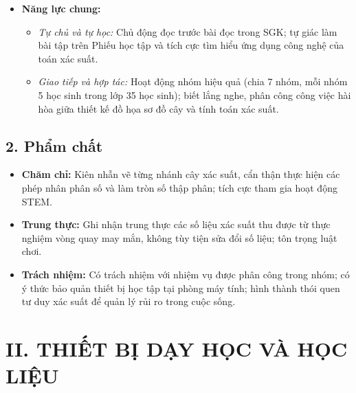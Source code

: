 \documentclass[12pt, a4paper]{article}
\begin{document}
\begin{itemize}[leftmargin=1.2cm]
    \item \textbf{Năng lực chung:}
    \begin{itemize}[leftmargin=0.6cm]
        \item \textit{Tự chủ và tự học:} Chủ động đọc trước bài đọc trong SGK; tự giác làm bài tập trên Phiếu học tập và tích cực tìm hiểu ứng dụng công nghệ của toán xác suất.
        \item \textit{Giao tiếp và hợp tác:} Hoạt động nhóm hiệu quả (chia 7 nhóm, mỗi nhóm 5 học sinh trong lớp 35 học sinh); biết lắng nghe, phân công công việc hài hòa giữa thiết kế đồ họa sơ đồ cây và tính toán xác suất.
    \end{itemize}
\end{itemize}

\subsection*{2. Phẩm chất}

\begin{itemize}[leftmargin=1.2cm]
    \item \textbf{Chăm chỉ:} Kiên nhẫn vẽ từng nhánh cây xác suất, cẩn thận thực hiện các phép nhân phân số và làm tròn số thập phân; tích cực tham gia hoạt động STEM.
    \item \textbf{Trung thực:} Ghi nhận trung thực các số liệu xác suất thu được từ thực nghiệm vòng quay may mắn, không tùy tiện sửa đổi số liệu; tôn trọng luật chơi.
    \item \textbf{Trách nhiệm:} Có trách nhiệm với nhiệm vụ được phân công trong nhóm; có ý thức bảo quản thiết bị học tập tại phòng máy tính; hình thành thói quen tư duy xác suất để quản lý rủi ro trong cuộc sống.
\end{itemize}

\section*{II. THIẾT BỊ DẠY HỌC VÀ HỌC LIỆU}
\end{document}
